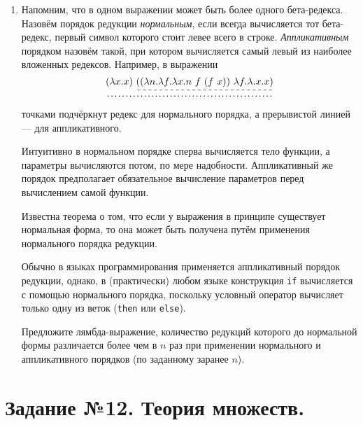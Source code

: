 \documentclass[10pt,a4paper,oneside]{article}
\begin{document}
\begin{enumerate}
\item Напомним, что в одном выражении может быть более одного бета-редекса. Назовём порядок редукции \emph{нормальным},
если всегда вычисляется тот бета-редекс, первый символ которого стоит левее всего в строке. \emph{Аппликативным}
порядком назовём такой, при котором вычисляется самый левый из наиболее вложенных редексов. 
Например, в выражении $$\dotuline{(\lambda x.x)\ \dashuline{((\lambda n.\lambda f.\lambda x.n\ f\ (f\ x))\ \lambda f.\lambda.x.x)}}$$
точками подчёркнут редекс для нормального порядка, а прерывистой линией --- для аппликативного.

Интуитивно в нормальном порядке
сперва вычисляется тело функции, а параметры вычисляются потом, по мере надобности. Аппликативный же порядок
предполагает обязательное вычисление параметров перед вычислением самой функции.

Известна теорема о том, что если у выражения в принципе существует нормальная форма, то она может быть получена
путём применения нормального порядка редукции.

Обычно в языках программирования применяется аппликативный порядок редукции, однако,
в (практически) любом языке конструкция \verb!if! вычисляется с помощью нормального порядка, поскольку условный оператор
вычисляет только одну из веток (\verb!then! или \verb!else!). 

Предложите лямбда-выражение, количество редукций которого до нормальной формы различается более чем в $n$ раз при применении
нормального и аппликативного порядков (по заданному заранее $n$).
\end{enumerate}

\section*{Задание №12. Теория множеств.}
\end{document}
